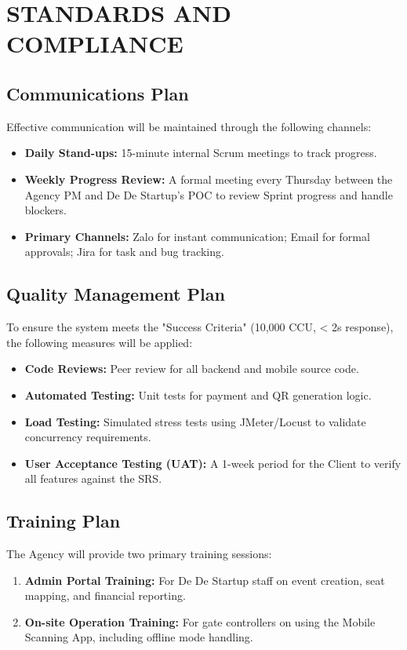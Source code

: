 \chapter{STANDARDS AND COMPLIANCE}

\section{Communications Plan}
Effective communication will be maintained through the following channels:
\begin{itemize}
    \item \textbf{Daily Stand-ups:} 15-minute internal Scrum meetings to track progress.
    \item \textbf{Weekly Progress Review:} A formal meeting every Thursday between the Agency PM and De De Startup’s POC to review Sprint progress and handle blockers.
    \item \textbf{Primary Channels:} Zalo for instant communication; Email for formal approvals; Jira for task and bug tracking.
\end{itemize}

\section{Quality Management Plan}
To ensure the system meets the "Success Criteria" (10,000 CCU, < 2s response), the following measures will be applied:
\begin{itemize}
    \item \textbf{Code Reviews:} Peer review for all backend and mobile source code.
    \item \textbf{Automated Testing:} Unit tests for payment and QR generation logic.
    \item \textbf{Load Testing:} Simulated stress tests using JMeter/Locust to validate concurrency requirements.
    \item \textbf{User Acceptance Testing (UAT):} A 1-week period for the Client to verify all features against the SRS.
\end{itemize}

\section{Training Plan}
The Agency will provide two primary training sessions:
\begin{enumerate}
    \item \textbf{Admin Portal Training:} For De De Startup staff on event creation, seat mapping, and financial reporting.
    \item \textbf{On-site Operation Training:} For gate controllers on using the Mobile Scanning App, including offline mode handling.
\end{enumerate}

